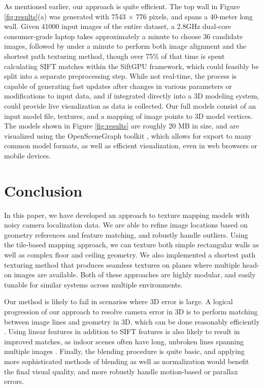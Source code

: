 \documentclass[]{spie}  %
\begin{document}
As mentioned earlier, our approach is quite efficient. The top wall in
Figure \ref{fig:results}(a) was generated with 7543 $\times$ 776
pixels, and spans a 40-meter long wall. Given 41000 input images of
the entire dataset, a 2.8GHz dual-core consumer-grade laptop takes
approximately a minute to choose 36 candidate images, followed by
under a minute to perform both image alignment and the shortest path
texturing method, though over 75\% of that time is spent calculating
SIFT matches within the SiftGPU framework, which could feasibly be
split into a separate preprocessing step. While not real-time, the
process is capable of generating fast updates after changes in various
parameters or modifications to input data, and if integrated directly
into a 3D modeling system, could provide live visualization as data is
collected. Our full models consist of an input model file, textures,
and a mapping of image points to 3D model vertices. The models shown
in Figure \ref{fig:results} are roughly 20 MB in size, and are
visualized using the OpenSceneGraph toolkit \cite{openscenegraph},
which allows for export to many common model formats, as well as
efficient visualization, even in web browsers or mobile devices.

\section{Conclusion}
\label{sec:conclusion}

In this paper, we have developed an approach to texture mapping models
with noisy camera localization data. We are able to refine image
locations based on geometry references and feature matching, and
robustly handle outliers. Using the tile-based mapping approach, we
can texture both simple rectangular walls as well as complex floor and
ceiling geometry. We also implemented a shortest path texturing method
that produces seamless textures on planes where multiple head-on
images are available. Both of these approaches are highly modular, and
easily tunable for similar systems across multiple environments.

Our method is likely to fail in scenarios where 3D error is large. A
logical progression of our approach to resolve camera error in 3D is
to perform matching between image lines and geometry in 3D, which can
be done reasonably efficiently \cite{linebased,
  rectangularstructures}. Using linear features in addition to SIFT
features is also likely to result in improved matches, as indoor
scenes often have long, unbroken lines spanning multiple images
\cite{linearposeestimation}. Finally, the blending procedure is quite
basic, and applying more sophisticated methods of blending as well as
normalization would benefit the final visual quality, and more
robustly handle motion-based or parallax errors.
\end{document}
